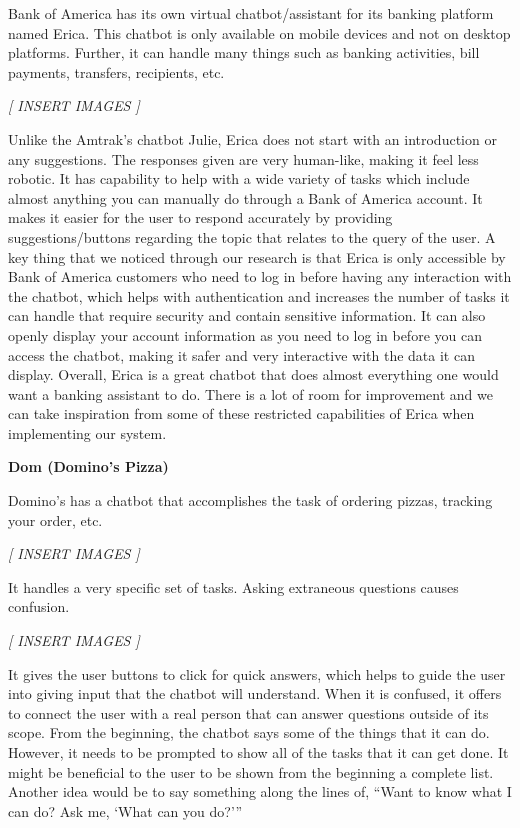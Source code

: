 \documentclass[titlepage, 12pt]{article}
\begin{document}
Bank of America has its own virtual chatbot/assistant for its banking platform named Erica. This chatbot is only available on mobile devices and not on desktop platforms. Further, it can handle many things such as banking activities, bill payments, transfers, recipients, etc.

\begin{center}\emph{[ INSERT IMAGES ]}\end{center}

Unlike the Amtrak’s chatbot Julie, Erica does not start with an introduction or any suggestions. The responses given are very human-like, making it feel less robotic. It has capability to help with a wide variety of tasks which include almost anything you can manually do through a Bank of America account. It makes it easier for the user to respond accurately by providing suggestions/buttons regarding the topic that relates to the query of the user. A key thing that we noticed through our research is that Erica is only accessible by Bank of America customers who need to log in before having any interaction with the chatbot, which helps with authentication and increases the number of tasks it can handle that require security and contain sensitive information. It can also openly display your account information as you need to log in before you can access the chatbot, making it safer and very interactive with the data it can display. Overall, Erica is a great chatbot that does almost everything one would want a banking assistant to do. There is a lot of room for improvement and we can take inspiration from some of these restricted capabilities of Erica when implementing our system.

\textbf{Dom (Domino's Pizza)}

Domino’s has a chatbot that accomplishes the task of ordering pizzas, tracking your order, etc.  

\begin{center}\emph{[ INSERT IMAGES ]}\end{center}

It handles a very specific set of tasks. Asking extraneous questions causes confusion.

\begin{center}\emph{[ INSERT IMAGES ]}\end{center}

It gives the user buttons to click for quick answers, which helps to guide the user into giving input that the chatbot will understand. When it is confused, it offers to connect the user with a real person that can answer questions outside of its scope. From the beginning, the chatbot says some of the things that it can do. However, it needs to be prompted to show all of the tasks that it can get done. It might be beneficial to the user to be shown from the beginning a complete list. Another idea would be to say something along the lines of, “Want to know what I can do? Ask me, ‘What can you do?’”
\end{document}
